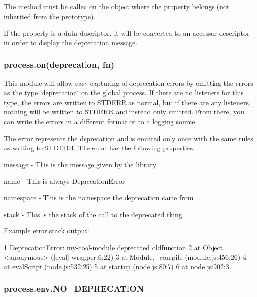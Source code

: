 The method must be called on the object where the property belongs (not inherited from the prototype).

If the property is a data descriptor, it will be converted to an accessor descriptor in order to display the deprecation message.

\subsubsection*{process.\+on(\textquotesingle{}deprecation\textquotesingle{}, fn)}

This module will allow easy capturing of deprecation errors by emitting the errors as the type \char`\"{}deprecation\char`\"{} on the global {\ttfamily process}. If there are no listeners for this type, the errors are written to S\+T\+D\+E\+R\+R as normal, but if there are any listeners, nothing will be written to S\+T\+D\+E\+R\+R and instead only emitted. From there, you can write the errors in a different format or to a logging source.

The error represents the deprecation and is emitted only once with the same rules as writing to S\+T\+D\+E\+R\+R. The error has the following properties\+:


\begin{DoxyItemize}
\item {\ttfamily message} -\/ This is the message given by the library
\item {\ttfamily name} -\/ This is always {\ttfamily \textquotesingle{}Deprecation\+Error\textquotesingle{}}
\item {\ttfamily namespace} -\/ This is the namespace the deprecation came from
\item {\ttfamily stack} -\/ This is the stack of the call to the deprecated thing
\end{DoxyItemize}

\hyperlink{struct_example}{Example} {\ttfamily error.\+stack} output\+:


\begin{DoxyCode}
1 DeprecationError: my-cool-module deprecated oldfunction
2     at Object.<anonymous> ([eval]-wrapper:6:22)
3     at Module.\_compile (module.js:456:26)
4     at evalScript (node.js:532:25)
5     at startup (node.js:80:7)
6     at node.js:902:3
\end{DoxyCode}


\subsubsection*{process.\+env.\+N\+O\+\_\+\+D\+E\+P\+R\+E\+C\+A\+T\+I\+O\+N}

